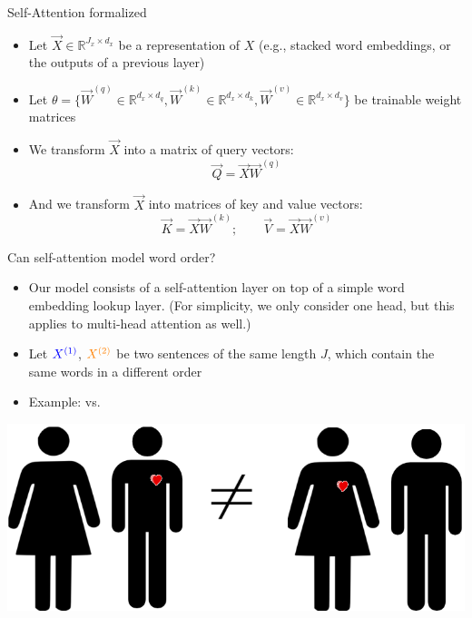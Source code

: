 \begin{vbframe}{Self-Attention formalized}

\vfill

\begin{itemize}
\item Let $\vec X \in \mathbb{R}^{J_x \times d_x}$ be a representation of $X$ (e.g., stacked word embeddings, or the outputs of a previous layer)
\item Let $\theta = \{\vec W^{(q)} \in \mathbb{R}^{d_x \times d_q}, \vec W^{(k)} \in \mathbb{R}^{d_x \times d_k}, \vec W^{(v)} \in \mathbb{R}^{d_x \times d_v}\}$ be trainable weight matrices
\item We transform $\vec X$ into a matrix of query vectors:
$$ \vec Q = \vec X \vec W^{(q)} $$
\item And we transform $\vec X$ into matrices of key and value vectors:
$$ \vec K = \vec X \vec W^{(k)} ; \qquad \vec V =  \vec X \vec W^{(v)}$$
\end{itemize}

\vfill

\end{vbframe}


\begin{vbframe}{Can self-attention model word order?}

\vfill

\begin{itemize}
	\item Our model consists of a self-attention layer on top of a simple word embedding lookup layer. (For simplicity, we only consider one head, but this applies to multi-head attention as well.)
	\item Let $\textcolor{blue}{X^{(1)}}$, $\textcolor{orange}{X^{(2)}}$ be two sentences of the same length $J$, which contain the same words in a different order
	\item Example:  vs. 
\end{itemize}
\begin{center}
	\includegraphics[width=.6\textwidth]{figure/mary_loves_john}
\end{center}

\vfill

\end{vbframe}

